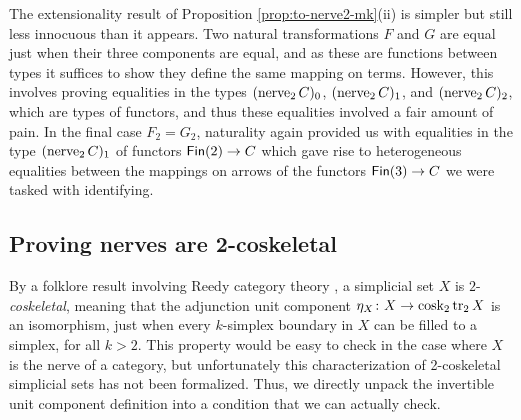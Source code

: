 \documentclass[a4paper,UKenglish,cleveref, autoref, thm-restate]{lipics-v2021}
\newcommand{\cosk}{\textup{cosk}}
\newcommand{\tr}{\textup{tr}}
\newcommand{\nerve}{\textup{nerve}}
\newcommand{\cat}[1]{\textup{\textsf{#1}}}%
\newcommand{\1}{\mathbbe{1}}
\newcommand{\2}{\mathbbe{2}}
\newcommand{\3}{\mathbbe{3}}
\newcommand{\Fin}{\cat{Fin}}
\begin{document}
The extensionality result of Proposition \ref{prop:to-nerve2-mk}(ii) is simpler but still less innocuous than it appears. Two natural transformations $F$ and $G$ are equal just when their three components are equal, and as these are functions between types it suffices to show they define the same mapping on terms. However, this involves proving equalities in the types $(\nerve_2\,C)_0$, $(\nerve_2\,C)_1$, and $(\nerve_2\,C)_2$, which are types of functors, and thus these equalities involved a fair amount of pain. In the final case $F_2 = G_2$, naturality again provided us with equalities in the type $(\nerve_2\,C)_1$ of functors $\Fin(2) \to C$ which gave rise to heterogeneous equalities between the mappings on arrows of the functors $\Fin(3) \to C$ we were tasked with identifying.

\subsection{Proving nerves are 2-coskeletal}\label{sec:strict-segal}


By a folklore result involving Reedy category theory \cite{Reedy}, a simplicial set $X$ is $2$-\emph{coskeletal}, meaning that the adjunction unit component $\eta_X\colon X \to \cosk_2\, \tr_2\, X$ is an isomorphism, just when every $k$-simplex boundary in $X$ can be filled to a simplex, for all $k > 2$. This property would be easy to check in the case where $X$ is the nerve of a category, but unfortunately this characterization of 2-coskeletal simplicial sets has not been formalized. Thus, we directly unpack the invertible unit component definition into a condition that we can actually check.

\end{document}
